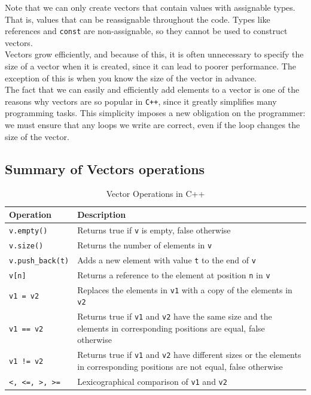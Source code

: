Note that we can only create vectors that contain values with assignable types.
That is, values that can be reassignable throughout the code. Types like references
and \texttt{const} are non-assignable, so they cannot be used to construct vectors.\\

Vectors grow efficiently, and because of this, it is often unnecessary to specify the size of a vector when it is created,
since it can lead to poorer performance. The exception of this is when you know the size of the vector in advance.\\

The fact that we can easily and efficiently add elements to a vector is one of the reasons why vectors are so popular in
\texttt{C++}, since it greatly simplifies many programming tasks. This simplicity imposes a new obligation on the programmer:
we must ensure that any loops we write are correct, even if the loop changes the size of the vector.\\

\subsection{Summary of Vectors operations}

\begin{table}[ht]
\centering
\begin{tabular}{|l|p{10cm}|}
\hline
\textbf{Operation} & \textbf{Description} \\
\hline
\texttt{v.empty()} & Returns true if \texttt{v} is empty, false otherwise \\
\hline
\texttt{v.size()} & Returns the number of elements in \texttt{v} \\
\hline
\texttt{v.push\_back(t)} & Adds a new element with value \texttt{t} to the end of \texttt{v} \\
\hline
\texttt{v[n]} & Returns a reference to the element at position \texttt{n} in \texttt{v} \\
\hline
\texttt{v1 = v2} & Replaces the elements in \texttt{v1} with a copy of the elements in \texttt{v2} \\
\hline
\texttt{v1 == v2} & Returns true if \texttt{v1} and \texttt{v2} have the same size and the elements in corresponding positions are equal, false otherwise \\
\hline
\texttt{v1 != v2} & Returns true if \texttt{v1} and \texttt{v2} have different sizes or the elements in corresponding positions are not equal, false otherwise \\
\hline
\texttt{<, <=, >, >=} & Lexicographical comparison of \texttt{v1} and \texttt{v2} \\
\hline
\end{tabular}
\caption{Vector Operations in C++}
\label{tab:vector_operations}
\end{table}





